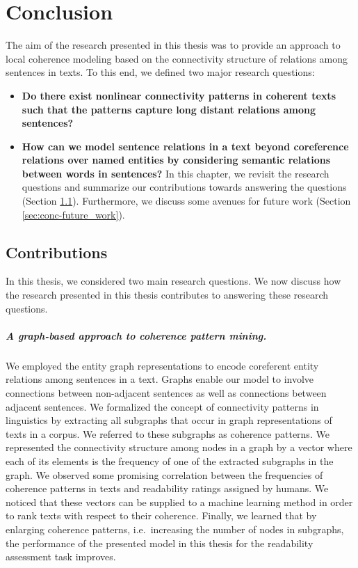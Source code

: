 
\chapter{Conclusion} 
\label{ch:conc} 
The aim of the research presented in this thesis was to provide an approach to local coherence modeling based on the connectivity structure of relations among sentences in  texts. 
To this end, we defined two major research questions: 
\begin{itemize}
\item \textbf{Do there exist nonlinear connectivity patterns in coherent texts such that the patterns capture long distant relations among sentences?} 
\item \textbf{How can we model sentence relations in a text beyond coreference relations over named entities by considering semantic relations between words in sentences?} 
In this chapter, we revisit the research questions and summarize our contributions towards answering the questions (Section \ref{sec:conc-contributions}). 
Furthermore, we discuss some avenues for future work (Section \ref{sec:conc-future_work}).
\end{itemize}

\section{Contributions}
\label{sec:conc-contributions}


In this thesis, we considered two main research questions. 
We now discuss how the research presented in this thesis contributes to answering these research questions.

\paragraph{A graph-based approach to coherence pattern mining.} 
We employed the entity graph representations to encode coreferent entity relations among sentences in a text. 
Graphs enable our model to involve connections between non-adjacent sentences as well as connections between adjacent sentences. 
We formalized the concept of connectivity patterns in linguistics \cite{danes74a,stoddard91} by extracting all subgraphs that occur in graph representations of texts in a corpus. 
We referred to these subgraphs as coherence patterns. 
We represented the connectivity structure among nodes in a graph by a vector where each of its elements is the frequency of one of the extracted subgraphs in the graph. 
We observed some promising correlation between the frequencies of coherence patterns in texts and  readability ratings assigned by humans. 
We noticed that these vectors can be supplied to a machine learning method in order to rank texts with respect to their coherence. 
Finally, we learned that by enlarging coherence patterns, i.e.\ increasing the number of nodes in subgraphs, the performance of the presented model in this thesis for the readability assessment task improves. 

